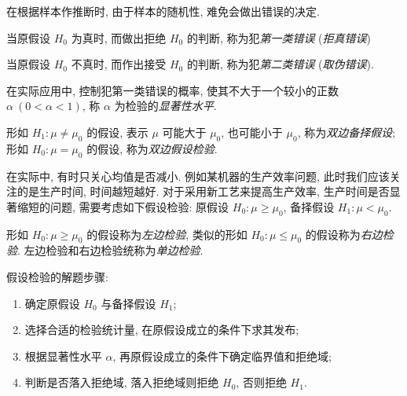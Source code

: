 在根据样本作推断时, 由于样本的随机性, 难免会做出错误的决定.

\begin{definition}[第一类错误]
    当原假设 $ H_{0} $ 为真时, 而做出拒绝 $ H_{0} $ 的判断, 称为犯\textit{第一类错误} (\textit{拒真错误})
    \label{category_1Errors}
\end{definition}

\begin{definition}[第二类错误]
    当原假设 $ H_{0} $ 不真时, 而作出接受 $ H_{0} $ 的判断, 称为犯\textit{第二类错误} (\textit{取伪错误}).
\end{definition}

\begin{definition}[显著性水平]
    在实际应用中, 控制犯第一类错误的概率, 使其不大于一个较小的正数 $ \alpha~(0<\alpha<1)$, 称 $ \alpha $ 为检验的\textit{显著性水平}.
\end{definition}

\begin{definition}[双边备择假设与双边假设检验]
    形如 $ H_{1}: \mu \neq \mu_{0} $ 的假设, 表示 $ \mu $ 可能大于 $ \mu_{0} $, 也可能小于 $ \mu_{0}$, 称为\textit{双边备择假设};
    形如 $ H_{0}: \mu=\mu_{0} $ 的假设, 称为\textit{双边假设检验}.
\end{definition}

在实际中, 有时只关心均值是否减小. 例如某机器的生产效率问题, 此时我们应该关注的是生产时间, 时间越短越好.
对于采用新工艺来提高生产效率, 生产时间是否显著缩短的问题, 需要考虑如下假设检验:
原假设 $ H_{0}: \mu \geqslant \mu_{0}$, 备择假设 $ H_{1}: \mu<\mu_{0} .$

\begin{definition}[单边检验]
    形如 $ H_{0}: \mu \geqslant \mu_{0} $ 的假设称为\textit{左边检验}, 类似的形如 $ H_{0}: \mu \leqslant \mu_{0} $ 的假设称为\textit{右边检验}.
    左边检验和右边检验统称为\textit{单边检验}.
\end{definition}

假设检验的解题步骤:
\begin{enumerate}[label=(\arabic{*})]
    \item 确定原假设 $H_0$ 与备择假设 $H_1$;
    \item 选择合适的检验统计量, 在原假设成立的条件下求其发布;
    \item 根据显著性水平 $\alpha$, 再原假设成立的条件下确定临界值和拒绝域;
    \item 判断是否落入拒绝域, 落入拒绝域则拒绝 $H_0$, 否则拒绝 $H_1$.
\end{enumerate}

